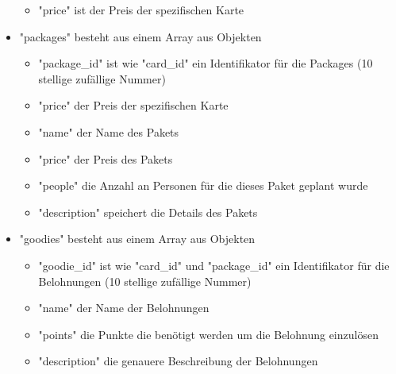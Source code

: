 \documentclass[12pt, letterpaper, twoside]{article}
\begin{document}
\begin{itemize}
\begin{itemize}
						\item "price" ist der Preis der spezifischen Karte
					\end{itemize}
					\item "packages" besteht aus einem Array aus Objekten
					\begin{itemize}
						\item "package\_id" ist wie "card\_id" ein Identifikator für die Packages (10 stellige zufällige Nummer)
						\item "price" der Preis der spezifischen Karte
						\item "name" der Name des Pakets
						\item "price" der Preis des Pakets
						\item "people" die Anzahl an Personen für die dieses Paket geplant wurde
						\item "description" speichert die Details des Pakets
					\end{itemize}
					\item "goodies" besteht aus einem Array aus Objekten
					\begin{itemize}
						\item "goodie\_id" ist wie "card\_id" und "package\_id" ein Identifikator für die Belohnungen (10 stellige zufällige Nummer)
						\item "name" der Name der Belohnungen
						\item "points" die Punkte die benötigt werden um die Belohnung einzulösen
						\item "description" die genauere Beschreibung der Belohnungen
					\end{itemize}				
				\end{itemize}
		
			\newpage
			
\end{document}
